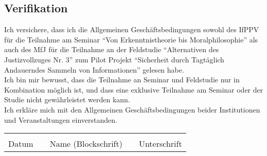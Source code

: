 \documentclass[a4paper, 12pt]{scrartcl}
\begin{document}
  \subsection{Verifikation}
  
  Ich versichere, dass ich die Allgemeinen Gesch\"aftsbedingungen sowohl des IfPPV f\"ur die Teilnahme am Seminar \enquote{Von Erkenntnistheorie bis Moralphilosophie} als auch des MfJ f\"ur die Teilnahme an der Feldstudie \enquote{Alternativen des Justizvollzuges Nr. 3} zum Pilot Projekt \enquote{Sicherheit durch Tagt\"aglich Andauerndes Sammeln von Informationen} gelesen habe.\\
  Ich bin mir bewusst, dass die Teilnahme an Seminar und Feldstudie nur in Kombination m\"oglich ist, und dass eine exklusive Teilnahme am Seminar oder der Studie nicht gew\"ahrleistet werden kann.\\
  Ich erkl\"are mich mit den Allgemeinen Gesch\"aftsbedingungen beider Institutionen und Veranstaltungen einverstanden.\\[1em]
  \vfill
  \begin{footnotesize}
    \begin{center}
      \begin{tabularx}{0.9\textwidth}{X c X c X}
        \hrulefill & & \hrulefill & & \hrulefill\\
        Datum & & Name (Blockschrift) & & Unterschrift\\
      \end{tabularx}
    \end{center}
  \end{footnotesize}
  
\end{document}
